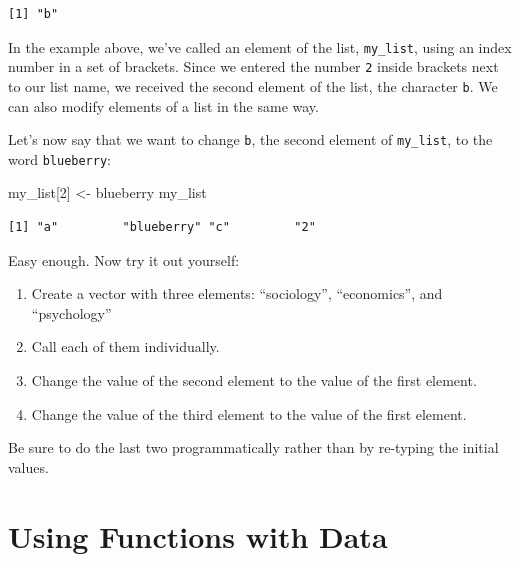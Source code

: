 \documentclass[
  letterpaper,
]{book}
\newenvironment{Shaded}{\begin{snugshade}}{\end{snugshade}}
\newcommand{\DecValTok}[1]{\textcolor[rgb]{0.68,0.00,0.00}{#1}}
\newcommand{\NormalTok}[1]{\textcolor[rgb]{0.00,0.23,0.31}{#1}}
\newcommand{\OtherTok}[1]{\textcolor[rgb]{0.00,0.23,0.31}{#1}}
\newcommand{\StringTok}[1]{\textcolor[rgb]{0.13,0.47,0.30}{#1}}
\providecommand{\tightlist}{%
  \setlength{\itemsep}{0pt}\setlength{\parskip}{0pt}}\usepackage{longtable,booktabs,array}
\begin{document}
\begin{verbatim}
[1] "b"
\end{verbatim}

In the example above, we've called an element of the list,
\texttt{my\_list}, using an index number in a set of brackets. Since we
entered the number \texttt{2} inside brackets next to our list name, we
received the second element of the list, the character
\texttt{\textquotesingle{}b\textquotesingle{}}. We can also modify
elements of a list in the same way.

Let's now say that we want to change
\texttt{\textquotesingle{}b\textquotesingle{}}, the second element of
\texttt{my\_list}, to the word
\texttt{\textquotesingle{}blueberry\textquotesingle{}}:

\begin{Shaded}
\begin{Highlighting}[]
\NormalTok{my\_list[}\DecValTok{2}\NormalTok{] }\OtherTok{\textless{}{-}} \StringTok{\textquotesingle{}blueberry\textquotesingle{}}
\NormalTok{my\_list}
\end{Highlighting}
\end{Shaded}

\begin{verbatim}
[1] "a"         "blueberry" "c"         "2"        
\end{verbatim}

Easy enough. Now try it out yourself:

\begin{enumerate}
\def\labelenumi{\arabic{enumi}.}
\tightlist
\item
  Create a vector with three elements: ``sociology'', ``economics'', and
  ``psychology''
\item
  Call each of them individually.
\item
  Change the value of the second element to the value of the first
  element.
\item
  Change the value of the third element to the value of the first
  element.
\end{enumerate}

Be sure to do the last two programmatically rather than by re-typing the
initial values.

\hypertarget{using-functions-with-data}{%
\section{Using Functions with Data}\label{using-functions-with-data}}
\end{document}
